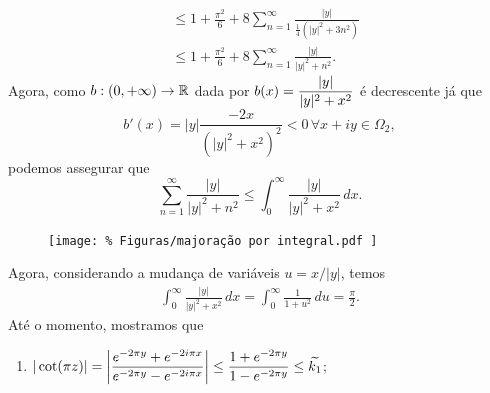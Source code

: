\begin{exemplo}
\begin{align*}
            &\leq 1 + \frac{\pi^2}{6} + 
            8\sum_{n=1}^{\infty} \frac{|y|}{\frac{1}{4}(|y|^2 + 3n^2)} \\
            &\leq 1 + \frac{\pi^2}{6} +
            8\sum_{n=1}^{\infty} \frac{|y|}{|y|^2 + n^2}.
        \end{align*}
        Agora, como $b:(0, +\infty)\to\mathbb{R}$ dada por $\displaystyle{ b(x) = \frac{|y|}{|y|^2 + x^2} }$
        é decrescente já que
        \begin{equation*}
            b'(x) = |y|\frac{-2x}{(|y|^2 + x^2)^2} < 0 \, \forall x+iy \in\Omega_2,
        \end{equation*}
        podemos assegurar que
        \begin{equation*}
            \sum_{n=1}^{\infty} \frac{|y|}{|y|^2 + n^2} 
            \leq
            \int_0^{\infty} \frac{|y|}{|y|^2 + x^2} \, dx.
        \end{equation*}
        \begin{figure}[H]\centering
            \texttt{[image: \%
                Figuras/majoração por integral.pdf
            ]}
        \end{figure}
        Agora, considerando a mudança de variáveis $u = x/|y|$, temos
        \begin{align*}
            \int_0^{\infty} \frac{|y|}{|y|^2 + x^2} \, dx = 
            \int_0^{\infty} \frac{1}{1 + u^2} \, du =
            \frac{\pi}{2}.
        \end{align*}
        Até o momento, mostramos que
        \begin{enumerate}
            \item $|\cot(\pi z)| = \displaystyle{ 
            \left|\frac{ e^{-2\pi y} + e^{-2i\pi x} }{ e^{-2\pi y} - e^{-2i\pi x} } \right|
            \leq \frac{ 1 + e^{-2\pi y} }{ 1 - e^{-2\pi y} }
            \leq \widetilde{k_1}}$;
            

\end{enumerate}
\end{exemplo}

